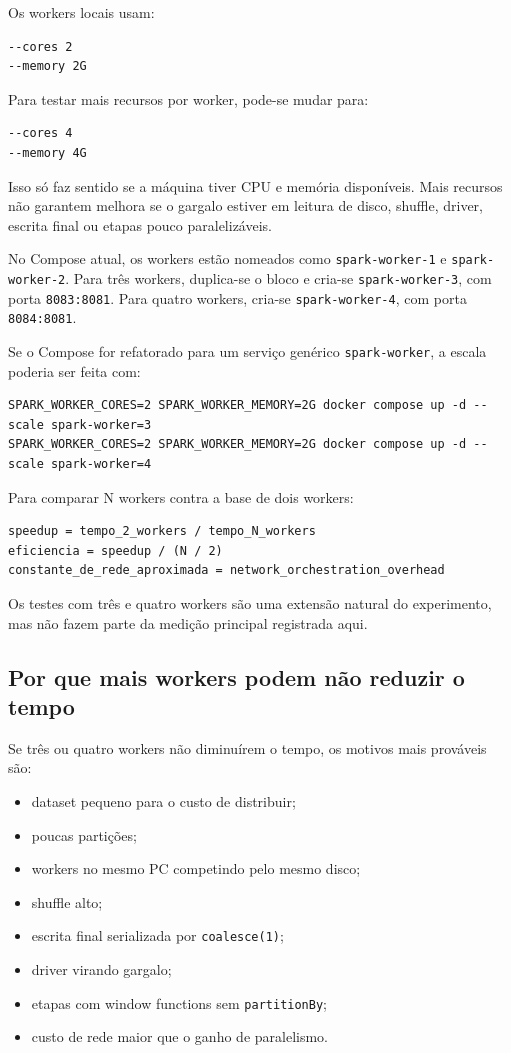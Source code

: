 \documentclass[12pt,a4paper]{article}
\begin{document}
Os workers locais usam:

\begin{lstlisting}
--cores 2
--memory 2G
\end{lstlisting}

Para testar mais recursos por worker, pode-se mudar para:

\begin{lstlisting}
--cores 4
--memory 4G
\end{lstlisting}

Isso só faz sentido se a máquina tiver CPU e memória disponíveis. Mais recursos não garantem melhora se o gargalo estiver em leitura de disco, shuffle, driver, escrita final ou etapas pouco paralelizáveis.

No Compose atual, os workers estão nomeados como \texttt{spark-worker-1} e \texttt{spark-worker-2}. Para três workers, duplica-se o bloco e cria-se \texttt{spark-worker-3}, com porta \texttt{8083:8081}. Para quatro workers, cria-se \texttt{spark-worker-4}, com porta \texttt{8084:8081}.

Se o Compose for refatorado para um serviço genérico \texttt{spark-worker}, a escala poderia ser feita com:

\begin{lstlisting}
SPARK_WORKER_CORES=2 SPARK_WORKER_MEMORY=2G docker compose up -d --scale spark-worker=3
SPARK_WORKER_CORES=2 SPARK_WORKER_MEMORY=2G docker compose up -d --scale spark-worker=4
\end{lstlisting}

Para comparar N workers contra a base de dois workers:

\begin{lstlisting}
speedup = tempo_2_workers / tempo_N_workers
eficiencia = speedup / (N / 2)
constante_de_rede_aproximada = network_orchestration_overhead
\end{lstlisting}

Os testes com três e quatro workers são uma extensão natural do experimento, mas não fazem parte da medição principal registrada aqui.

\subsection{Por que mais workers podem não reduzir o tempo}

Se três ou quatro workers não diminuírem o tempo, os motivos mais prováveis são:

\begin{itemize}
    \item dataset pequeno para o custo de distribuir;
    \item poucas partições;
    \item workers no mesmo PC competindo pelo mesmo disco;
    \item shuffle alto;
    \item escrita final serializada por \texttt{coalesce(1)};
    \item driver virando gargalo;
    \item etapas com window functions sem \texttt{partitionBy};
    \item custo de rede maior que o ganho de paralelismo.
\end{itemize}
\end{document}
